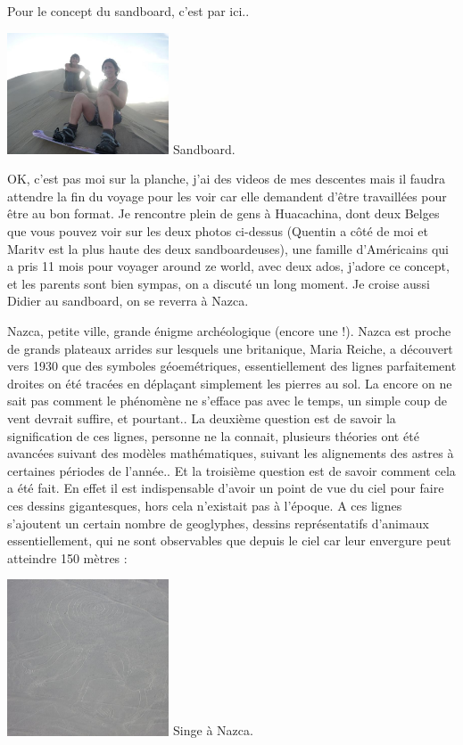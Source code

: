 \begin{multicols}{2}
Pour le concept du sandboard, c'est par ici..

\hspace*{-0.65cm}
\includegraphics[width=4.8cm]{articles/Cote-du-sud/1255997499n41M.jpg}
Sandboard.


OK, c'est pas moi sur la planche, j'ai des videos de mes descentes mais il faudra attendre la fin du voyage pour les voir car elle demandent d'être travaillées pour être au bon format. Je rencontre plein de gens à Huacachina, dont deux Belges que vous pouvez voir sur les deux photos ci-dessus (Quentin a côté de moi et Maritv est la plus haute des deux sandboardeuses), une famille d'Américains qui a pris 11 mois pour voyager around ze world, avec deux ados, j'adore ce concept, et les parents sont bien sympas, on a discuté un long moment. Je croise aussi Didier au sandboard, on se reverra à Nazca.

Nazca, petite ville, grande énigme archéologique (encore une !). Nazca est proche de grands plateaux arrides sur lesquels une britanique, Maria Reiche, a découvert vers 1930 que des symboles géoemétriques, essentiellement des lignes parfaitement droites on été tracées en déplaçant simplement les pierres au sol. La encore on ne sait pas comment le phénomène ne s'efface pas avec le temps, un simple coup de vent devrait suffire, et pourtant.. La deuxième question est de savoir la signification de ces lignes, personne ne la connait, plusieurs théories ont été avancées suivant des modèles mathématiques, suivant les alignements des astres à certaines périodes de l'année.. Et la troisième question est de savoir comment cela a été fait. En effet il est indispensable d'avoir un point de vue du ciel pour faire ces dessins gigantesques, hors cela n'existait pas à l'époque. A ces lignes s'ajoutent un certain nombre de geoglyphes, dessins représentatifs d'animaux essentiellement, qui ne sont observables que depuis le ciel car leur envergure peut atteindre 150 mètres :

\hspace*{-0.65cm}
\includegraphics[width=4.8cm]{articles/Cote-du-sud/1255996049EeEt.jpg}
Singe à Nazca.


\end{multicols}

